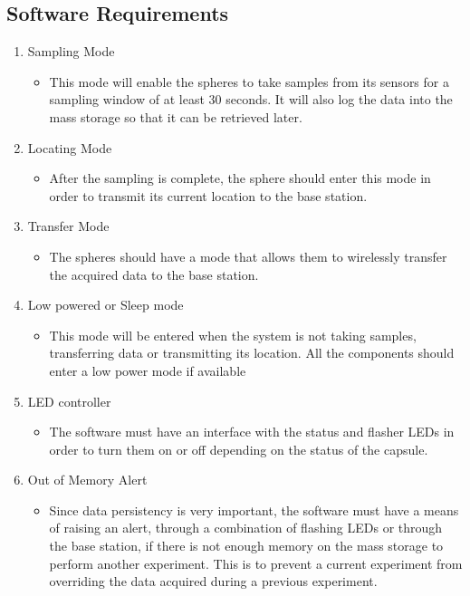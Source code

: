 \subsection{Software Requirements}
\begin{enumerate}
\item Sampling Mode
	\begin{itemize}
		\item This mode will enable the spheres to take samples from its sensors for a sampling window of at least 30 seconds.  It will also log the data into the mass storage so that it can be retrieved later.
	\end{itemize}
	
\item Locating Mode
	\begin{itemize}
		\item After the sampling is complete, the sphere should enter this mode in order to transmit its current location to the base station.
	\end{itemize}

\item Transfer Mode
	\begin{itemize}
		\item The spheres should have a mode that allows them to wirelessly transfer the acquired data to the base station.				\end{itemize}
			
\item Low powered or Sleep mode
	\begin{itemize}
		\item This mode will be entered when the system is not taking samples, transferring data or transmitting its location.  All the components should enter a low power mode if available
	\end{itemize}

\item LED controller
	\begin{itemize}
		\item The software must have an interface with the status and flasher LEDs in order to turn them on or off depending on the status of the capsule.
	\end{itemize}
	
\item Out of Memory Alert
	\begin{itemize}
		\item Since data persistency is very important, the software must have a means of raising an alert, through a combination of flashing LEDs or through the base station, if there is not enough memory on the mass storage to perform another experiment.  This is to prevent a current experiment from overriding the data acquired during a previous experiment.
	\end{itemize}

\end{enumerate}

